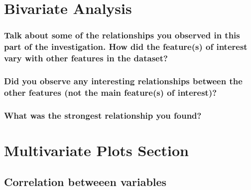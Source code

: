 \documentclass[]{article}
\begin{document}
\section{Bivariate Analysis}\label{bivariate-analysis}

\subsubsection{Talk about some of the relationships you observed in this
part of the investigation. How did the feature(s) of interest vary with
other features in the
dataset?}\label{talk-about-some-of-the-relationships-you-observed-in-this-part-of-the-investigation.-how-did-the-features-of-interest-vary-with-other-features-in-the-dataset}

\subsubsection{Did you observe any interesting relationships between the
other features (not the main feature(s) of
interest)?}\label{did-you-observe-any-interesting-relationships-between-the-other-features-not-the-main-features-of-interest}

\subsubsection{What was the strongest relationship you
found?}\label{what-was-the-strongest-relationship-you-found}

\section{Multivariate Plots Section}\label{multivariate-plots-section}

\subsection{Correlation betweeen
variables}\label{correlation-betweeen-variables}
\end{document}
